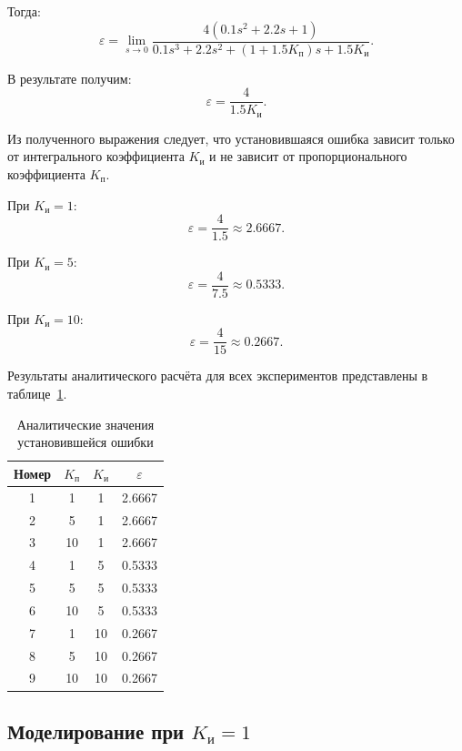 \documentclass[12pt, a4paper]{article}
\begin{document}
Тогда:
\[
    \varepsilon=
    \lim_{s\to0}
    \frac{4(0.1s^2+2.2s+1)}
    {0.1s^3+2.2s^2+
    (1+1.5K_{\text{п}})s+1.5K_{\text{и}}}.
\]

В результате получим:
\begin{equation}
    \boxed{
    \varepsilon=\frac{4}{1.5K_{\text{и}}}
    }.
\end{equation}

Из полученного выражения следует, что
установившаяся ошибка зависит только
от интегрального коэффициента $K_{\text{и}}$
и не зависит от пропорционального
коэффициента $K_{\text{п}}$.

При $K_{\text{и}}=1$:
\[
    \varepsilon=\frac{4}{1.5}
    \approx2.6667.
\]

При $K_{\text{и}}=5$:
\[
    \varepsilon=\frac{4}{7.5}
    \approx0.5333.
\]

При $K_{\text{и}}=10$:
\[
    \varepsilon=\frac{4}{15}
    \approx0.2667.
\]

Результаты аналитического расчёта
для всех экспериментов представлены
в таблице~\ref{tab:task3_errors}.

\begin{table}[H]
    \centering
    \caption{Аналитические значения установившейся ошибки}
    \label{tab:task3_errors}

    \setlength{\tabcolsep}{25pt}

    \begin{tabular}{cccc}
        \toprule
        Номер & $K_{\text{п}}$ &
        $K_{\text{и}}$ & $\varepsilon$ \\
        \midrule
        1 & 1  & 1  & 2.6667 \\
        2 & 5  & 1  & 2.6667 \\
        3 & 10 & 1  & 2.6667 \\
        4 & 1  & 5  & 0.5333 \\
        5 & 5  & 5  & 0.5333 \\
        6 & 10 & 5  & 0.5333 \\
        7 & 1  & 10 & 0.2667 \\
        8 & 5  & 10 & 0.2667 \\
        9 & 10 & 10 & 0.2667 \\
        \bottomrule
    \end{tabular}
\end{table}


\subsection{Моделирование при $K_{\text{и}}=1$}
\end{document}
